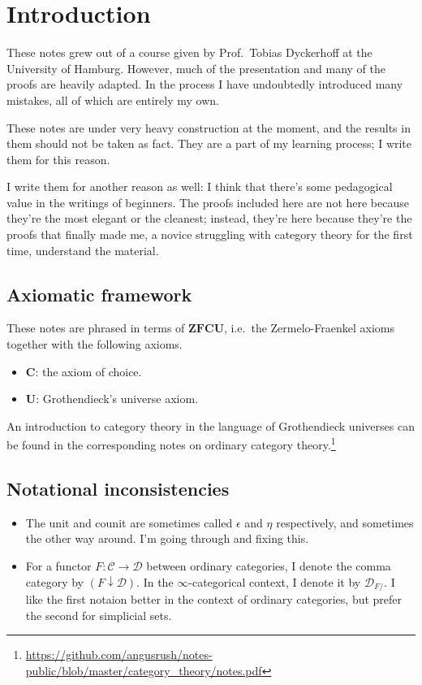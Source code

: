 \documentclass[main.tex]{subfiles}
\begin{document}
\chapter{Introduction}
\label{ch:introduction}

These notes grew out of a course given by Prof.\ Tobias Dyckerhoff at the University of Hamburg. However, much of the presentation and many of the proofs are heavily adapted. In the process I have undoubtedly introduced many mistakes, all of which are entirely my own.

These notes are under very heavy construction at the moment, and the results in them should not be taken as fact. They are a part of my learning process; I write them for this reason.

I write them for another reason as well: I think that there's some pedagogical value in the writings of beginners. The proofs included here are not here because they're the most elegant or the cleanest; instead, they're here because they're the proofs that finally made me, a novice struggling with category theory for the first time, understand the material.

\section{Axiomatic framework}
\label{sec:axiomatic_framework}

These notes are phrased in terms of $\mathbf{ZFCU}$, i.e.\ the Zermelo-Fraenkel axioms together with the following axioms.
\begin{itemize}
  \item $\mathbf{C}$: the axiom of choice.

  \item $\mathbf{U}$: Grothendieck's universe axiom.
\end{itemize}

An introduction to category theory in the language of Grothendieck universes can be found in the corresponding notes on ordinary category theory.\footnote{\url{https://github.com/angusrush/notes-public/blob/master/category_theory/notes.pdf}}

\section{Notational inconsistencies}
\label{sec:notation}

\begin{itemize}
  \item The unit and counit are sometimes called $\epsilon$ and $\eta$ respectively, and sometimes the other way around. I'm going through and fixing this.

  \item For a functor $F\colon \mathcal{C} \to \mathcal{D}$ between ordinary categories, I denote the comma category by $(F \downarrow \mathcal{D})$. In the $\infty$-categorical context, I denote it by $\mathcal{D}_{F/}$. I like the first notaion better in the context of ordinary categories, but prefer the second for simplicial sets.
\end{itemize}
\end{document}
